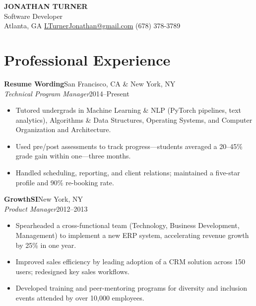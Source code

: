 \documentclass[letterpaper,10pt]{article}
\begin{document}
\begin{center}
{\LARGE\bfseries JONATHAN TURNER}\\[0.4em]
\fontsize{1.5em}{1.5em}\selectfont Software Developer \\[0.2em] 
\normalsize
Atlanta, GA \quad \textbar\quad \href{mailto:LTurnerJonathan@gmail.com}{LTurnerJonathan@gmail.com} \quad \textbar\quad (678) 378-3789 \\
\end{center}\vspace{1em}

\section{Professional Experience}

\noindent\textbf{Resume Wording}\hfill San Francisco, CA \& New York, NY\\
\textit{Technical Program Manager}\hfill 2014--Present
\begin{itemize}[leftmargin=*]
    \item Tutored undergrads in Machine Learning \& NLP (PyTorch pipelines, text analytics), Algorithms \& Data Structures, Operating Systems, and Computer Organization and Architecture.
    \item Used pre/post assessments to track progress—students averaged a 20–45\% grade gain within one---three months.
    \item Handled scheduling, reporting, and client relations; maintained a five-star profile and 90\% re-booking rate.
  \end{itemize}

\noindent\textbf{GrowthSI}\hfill New York, NY\\
\textit{Product Manager}\hfill 2012--2013
\begin{itemize}[leftmargin=*]
  \item Spearheaded a cross-functional team (Technology, Business Development, Management) to implement a new ERP system, accelerating revenue growth by 25\% in one year.
  \item Improved sales efficiency by leading adoption of a CRM solution across 150 users; redesigned key sales workflows.
  \item Developed training and peer-mentoring programs for diversity and inclusion events attended by over 10,000 employees.
\end{itemize}
\end{document}

